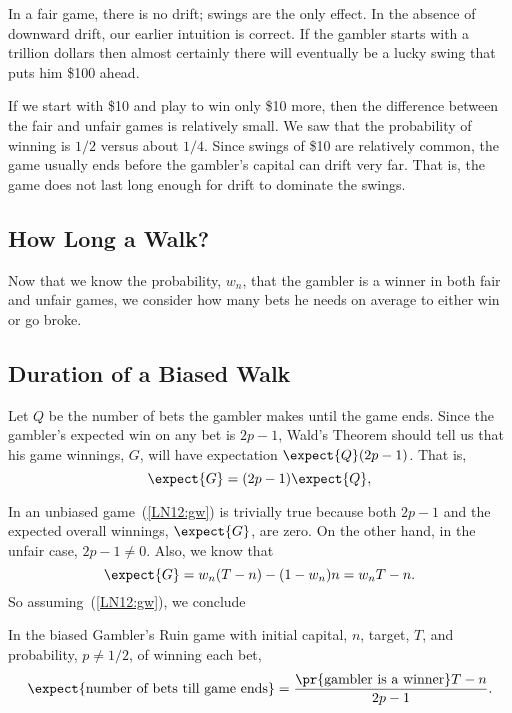 In a fair game, there is no drift; swings are the only effect.  In the
absence of downward drift, our earlier intuition is correct.  If the
gambler starts with a trillion dollars then almost certainly there
will eventually be a lucky swing that puts him \$100 ahead.

\begin{editingnotes}
If we start with \$10 and play to win only \$10 more, then the difference
between the fair and unfair games is relatively small. We saw that the
probability of winning is $1/2$ versus about $1/4$.  Since swings of \$10
are relatively common, the game usually ends before the gambler's capital
can drift very far.  That is, the game does not last long enough for drift
to dominate the swings.
\end{editingnotes}

\begin{editingnotes}

\subsection{How Long a Walk?}

Now that we know the probability, $w_n$, that the gambler is a winner in
both fair and unfair games, we consider how many bets he needs on average
to either win or go broke.

\subsection{Duration of a Biased Walk}

Let $Q$ be the number of bets the gambler makes until the game ends.  Since
the gambler's expected win on any bet is $2p-1$, Wald's Theorem should tell
us that his game winnings, $G$, will have expectation $\expect{Q}(2p-1)$.
That is,
\begin{equation}\label{LN12:gw}
\expect{G} = (2p-1)\expect{Q},
\end{equation}

In an unbiased game~(\ref{LN12:gw}) is trivially true because both $2p-1$ and
the expected overall winnings, $\expect{G}$, are zero.  On the other hand,
in the unfair case, $2p-1 \neq 0$.  Also, we know that
\[
\expect{G} = w_n(T-n) - (1-w_n)n = w_nT-n.
\]
So assuming~(\ref{LN12:gw}), we conclude
\begin{theorem}\label{LN12:ExQthm}
In the biased Gambler's Ruin game with initial capital, $n$, target,
$T$, and probability, $p \neq 1/2$, of winning each bet,
\begin{equation}\label{LN12:ExQ}
\expect{\text{number of bets till game ends}} =
\frac{\pr{\text{gambler is a winner}}T-n}{2p-1}.
\end{equation}
\end{theorem}


\end{editingnotes}
